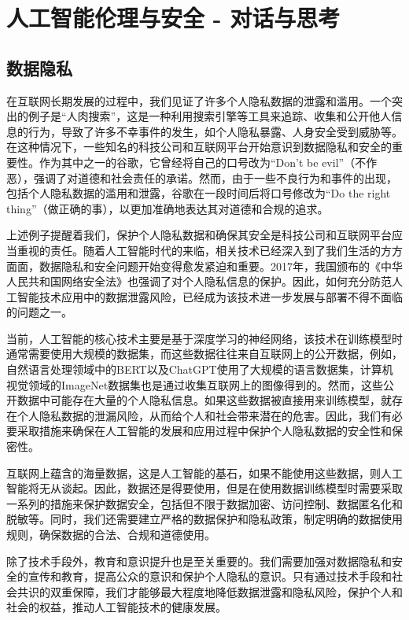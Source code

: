 
\setchapterpreamble[u]{\margintoc}
\chapter{人工智能伦理与安全 - 对话与思考}


\section{数据隐私}

在互联网长期发展的过程中，我们见证了许多个人隐私数据的泄露和滥用。一个突出的例子是“人肉搜索”，这是一种利用搜索引擎等工具来追踪、收集和公开他人信息的行为，导致了许多不幸事件的发生，如个人隐私暴露、人身安全受到威胁等。在这种情况下，一些知名的科技公司和互联网平台开始意识到数据隐私和安全的重要性。作为其中之一的谷歌，它曾经将自己的口号改为“Don't be evil”（不作恶），强调了对道德和社会责任的承诺。然而，由于一些不良行为和事件的出现，包括个人隐私数据的滥用和泄露，谷歌在一段时间后将口号修改为“Do the right thing”（做正确的事），以更加准确地表达其对道德和合规的追求。

上述例子提醒着我们，保护个人隐私数据和确保其安全是科技公司和互联网平台应当重视的责任。随着人工智能时代的来临，相关技术已经深入到了我们生活的方方面面，数据隐私和安全问题开始变得愈发紧迫和重要。2017年，我国颁布的《中华人民共和国网络安全法》也强调了对个人隐私信息的保护。因此，如何充分防范人工智能技术应用中的数据泄露风险，已经成为该技术进一步发展与部署不得不面临的问题之一。

当前，人工智能的核心技术主要是基于深度学习的神经网络，该技术在训练模型时通常需要使用大规模的数据集，而这些数据往往来自互联网上的公开数据，例如，自然语言处理领域中的BERT以及ChatGPT使用了大规模的语言数据集，计算机视觉领域的ImageNet数据集也是通过收集互联网上的图像得到的。然而，这些公开数据中可能存在大量的个人隐私信息。如果这些数据被直接用来训练模型，就存在个人隐私数据的泄漏风险，从而给个人和社会带来潜在的危害。因此，我们有必要采取措施来确保在人工智能的发展和应用过程中保护个人隐私数据的安全性和保密性。

互联网上蕴含的海量数据，这是人工智能的基石，如果不能使用这些数据，则人工智能将无从谈起。因此，数据还是得要使用，但是在使用数据训练模型时需要采取一系列的措施来保护数据安全，包括但不限于数据加密、访问控制、数据匿名化和脱敏等。同时，我们还需要建立严格的数据保护和隐私政策，制定明确的数据使用规则，确保数据的合法、合规和道德使用。

除了技术手段外，教育和意识提升也是至关重要的。我们需要加强对数据隐私和安全的宣传和教育，提高公众的意识和保护个人隐私的意识。只有通过技术手段和社会共识的双重保障，我们才能够最大程度地降低数据泄露和隐私风险，保护个人和社会的权益，推动人工智能技术的健康发展。

